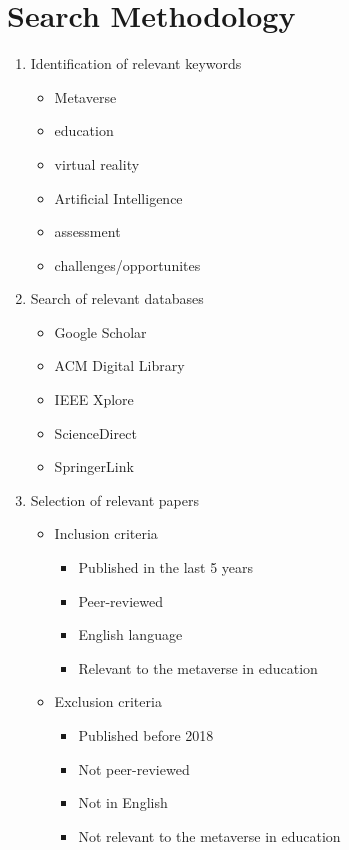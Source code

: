 \documentclass[12pt]{extarticle}
\begin{document}
\section{Search Methodology}
\begin{enumerate}
    \item Identification of relevant keywords
        \begin{itemize}
            \item Metaverse
            \item education
            \item virtual reality
            \item Artificial Intelligence
            \item assessment
            \item challenges/opportunites
        \end{itemize}
    \item Search of relevant databases
        \begin{itemize}
            \item Google Scholar
            \item ACM Digital Library
            \item IEEE Xplore
            \item ScienceDirect
            \item SpringerLink
        \end{itemize}
    \item Selection of relevant papers
        \begin{itemize}
            \item Inclusion criteria
                \begin{itemize}
                    \item Published in the last 5 years
                    \item Peer-reviewed
                    \item English language
                    \item Relevant to the metaverse in education
                \end{itemize}
            \item Exclusion criteria
                \begin{itemize}
                    \item Published before 2018
                    \item Not peer-reviewed
                    \item Not in English
                    \item Not relevant to the metaverse in education
                \end{itemize}
        \end{itemize}
\end{enumerate}
\end{document}
